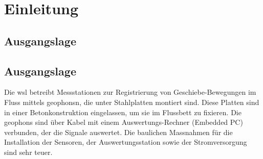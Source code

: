 %
%



\chapter{Einleitung}\label{chap.einleitung}

\section{Ausgangslage}
\section{Ausgangslage}\label{sec.ausgangslage}
Die \gls{wsl} betreibt Messstationen zur Registrierung von Geschiebe-Bewegungen im Fluss mittels \glspl{geophon}n, die unter Stahlplatten montiert sind. Diese Platten sind in einer Betonkonstruktion eingelassen, um sie im Flussbett zu fixieren. Die \glspl{geophon} sind über Kabel mit einem Auswertungs-Rechner (Embedded PC) verbunden, der die Signale auswertet. Die baulichen Massnahmen für die Installation der Sensoren, der Auswertungsstation sowie der Stromversorgung sind sehr teuer. 



